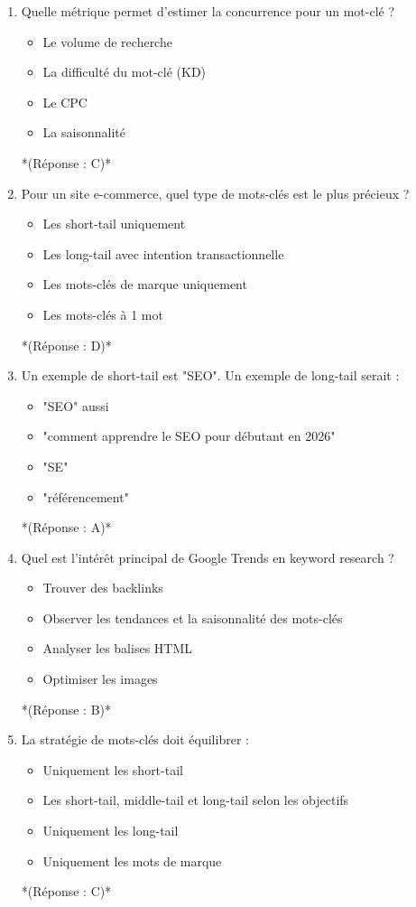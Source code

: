 \documentclass[12pt,a4paper,twoside]{report}
\begin{document}
\begin{enumerate}
\item Quelle métrique permet d'estimer la concurrence pour un mot-clé ?
\begin{itemize}
\item[A)] Le volume de recherche
\item[B)] La difficulté du mot-clé (KD)
\item[C)] Le CPC
\item[D)] La saisonnalité
\end{itemize}
*(Réponse : C)*

\item Pour un site e-commerce, quel type de mots-clés est le plus précieux ?
\begin{itemize}
\item[A)] Les short-tail uniquement
\item[B)] Les long-tail avec intention transactionnelle
\item[C)] Les mots-clés de marque uniquement
\item[D)] Les mots-clés à 1 mot
\end{itemize}
*(Réponse : D)*

\item Un exemple de short-tail est "SEO". Un exemple de long-tail serait :
\begin{itemize}
\item[A)] "SEO" aussi
\item[B)] "comment apprendre le SEO pour débutant en 2026"
\item[C)] "SE"
\item[D)] "référencement"
\end{itemize}
*(Réponse : A)*

\item Quel est l'intérêt principal de Google Trends en keyword research ?
\begin{itemize}
\item[A)] Trouver des backlinks
\item[B)] Observer les tendances et la saisonnalité des mots-clés
\item[C)] Analyser les balises HTML
\item[D)] Optimiser les images
\end{itemize}
*(Réponse : B)*

\item La stratégie de mots-clés doit équilibrer :
\begin{itemize}
\item[A)] Uniquement les short-tail
\item[B)] Les short-tail, middle-tail et long-tail selon les objectifs
\item[C)] Uniquement les long-tail
\item[D)] Uniquement les mots de marque
\end{itemize}
*(Réponse : C)*


\end{enumerate}
\end{document}
